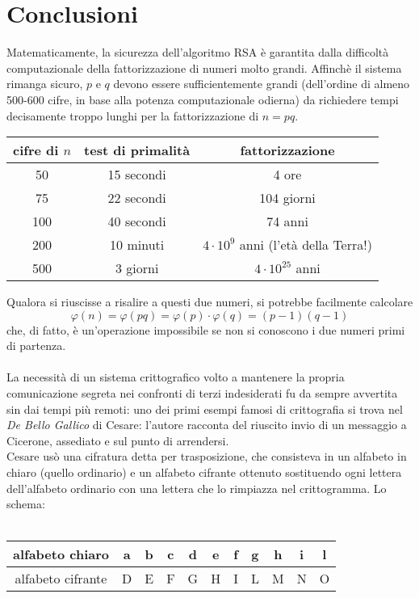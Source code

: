 \documentclass[a4paper,12pt]{article}
\begin{document}
\section{Conclusioni}
Matematicamente, la sicurezza dell'algoritmo RSA è garantita dalla difficoltà computazionale della fattorizzazione di numeri molto grandi. Affinchè il sistema rimanga sicuro, $p$ e $q$ devono essere sufficientemente grandi (dell'ordine di almeno 500-600 cifre, in base alla potenza computazionale odierna) da richiedere tempi decisamente troppo lunghi per la fattorizzazione di $n=pq$.
\begin{center}
{\renewcommand\arraystretch{1.2}
\begin{tabular}{| c | c | c |}
\hline
cifre di $n$ & test di primalità & fattorizzazione\\
\hline
50 & 15 secondi & 4 ore\\
\hline
75 & 22 secondi & 104 giorni\\
\hline
100 & 40 secondi & 74 anni\\
\hline
200 & 10 minuti & $4\cdot 10^{9}$ anni (l'età della Terra!)\\
\hline
500 & 3 giorni & $4 \cdot 10^{25}$ anni\\
\hline
\end{tabular}}
\end{center}
Qualora si riuscisse a risalire a questi due numeri, si potrebbe facilmente calcolare
\begin{equation*}
    \varphi(n)=\varphi(pq)=\varphi(p)\cdot\varphi(q)=(p-1)(q-1)
\end{equation*}
che, di fatto, è un'operazione impossibile se non si conoscono i due numeri primi di partenza.\\\\
La necessità di un sistema crittografico volto a mantenere la propria comunicazione segreta nei confronti di terzi indesiderati fu da sempre avvertita sin dai tempi più remoti: uno dei primi esempi famosi di crittografia si trova nel \emph{De Bello Gallico} di Cesare: l’autore racconta del riuscito invio di un messaggio a Cicerone, assediato e sul punto di arrendersi.\\
Cesare usò una cifratura detta per trasposizione, che consisteva in un alfabeto in chiaro (quello ordinario) e un alfabeto cifrante ottenuto sostituendo ogni lettera dell’alfabeto ordinario con una lettera che lo rimpiazza nel crittogramma. Lo schema:\\\\
\begin{tabular}{ | c | c | c | c | c | c | c | c | c | c | c | }
\hline
alfabeto chiaro & a & b & c & d & e & f & g & h & i & l \\
\hline
alfabeto cifrante & D & E & F & G & H & I & L & M & N & O \\
\hline
\end{tabular}\\
\end{document}
